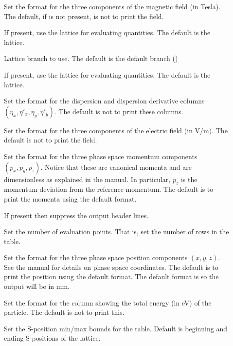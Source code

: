 {{{{{{{{{\begin{description}
\item[] \Newline
Set the format for the three components of the magnetic field (in Tesla). The default, if
 is not present, is not to print the field.
%
\item[] \Newline
If present, use the  lattice for evaluating quantities. The default is the 
lattice.
%
\item[] \Newline
Lattice branch to use. The default is the default branch ()
%
\item[] \Newline
If present, use the  lattice for evaluating quantities. The default is the 
lattice.
%
\item[] \Newline
Set the format for the dispersion and dispersion derivative columns $(\eta_x, \eta'_x, \eta_y,
\eta'_y)$. The default is not to print these columns.
%
\item[] \Newline
Set the format for the three components of the electric field (in V/m). The default is not to print
the field.
%
\item[] \Newline
Set the format for the three phase space momentum components $(p_x, p_y, p_z)$. Notice that these
are canonical momenta and are dimensionless as explained in the \bmad manual. In particular, $p_z$
is the momentum deviation from the reference momentum. The default is to print the momenta using the
default format.
%
\item[] \Newline
If present then suppress the output header lines.
%
\item[] \Newline
Set the number of evaluation points. That is, set the number of rows in the table.
%
\item[] \Newline
Set the format for the three phase space position components $(x, y, z)$. See the \bmad manual for 
details on phase space coordinates. The default is to print the position using the default format.
The default format is  so the output will be in mm.
%
\item[] \Newline
Set the format for the column showing the total energy (in eV) of the particle. The default is not
to print this.
%
\item[] \Newline
Set the S-position min/max bounds for the table. Default is beginning and ending S-positions of the lattice.

\end{description}}}}}}}}}}

